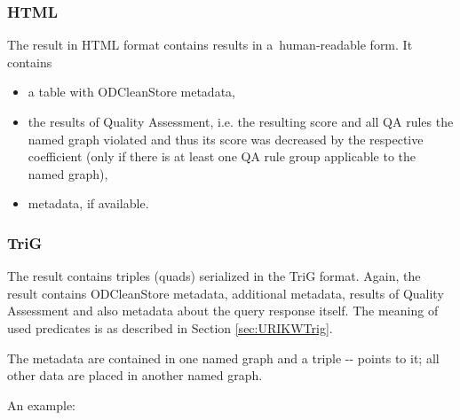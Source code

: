 \subsubsection{HTML}

The result in HTML format contains results in a~human-readable form. It contains

\begin{itemize}
  \item a table with ODCleanStore metadata,
  \item the results of Quality Assessment, i.e. the resulting score and all QA rules the named graph violated and thus its score was decreased by the respective coefficient (only if there is at least one QA rule group applicable to the named graph),
  \item {} metadata, if available.
\end{itemize}


\subsubsection{TriG}
\label{sec:metadataTriG}
The result contains triples (quads) serialized in the TriG format. Again, the result contains ODCleanStore metadata, additional  metadata, results of Quality Assessment and also metadata about the query response itself. The meaning of used predicates is as described in Section \ref{sec:URIKWTrig}.

The  metadata are contained in one named graph and a triple -- points to it; all other data are placed in another named graph.

\pagebreak[3]

An example:

